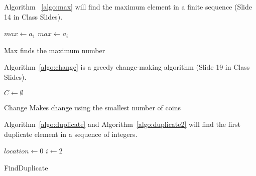 \documentclass{article}
\begin{document}
    Algorithm~ \ref{algo:max} will find the maximum element in a finite sequence (Slide 14 in Class Slides).
    
    \begin{algorithm}
    \DontPrintSemicolon %
    $max \gets a_1$\;
     {
       {
        $max \gets a_i$\;
      }
    }
    \;
    \caption{{\sc Max} finds the maximum number}
    \label{algo:max}
    \end{algorithm}
    
    Algorithm~\ref{algo:change} is a greedy change-making algorithm (Slide 19 in Class Slides).
    
    \begin{algorithm}
    \DontPrintSemicolon %
    $C \gets \emptyset$\;
    \;
    \caption{{\sc Change} Makes change using the smallest number of coins}
    \label{algo:change}
    \end{algorithm}
    
    Algorithm~\ref{algo:duplicate} and Algorithm~\ref{algo:duplicate2} will find the first duplicate element in a sequence of integers.
    
    \begin{algorithm}
    \DontPrintSemicolon %
    $location \gets 0$\;
    $i \gets 2$\;
    \;
    \caption{{\sc FindDuplicate}}
    \label{algo:duplicate}
    \end{algorithm}
    
\end{document}
